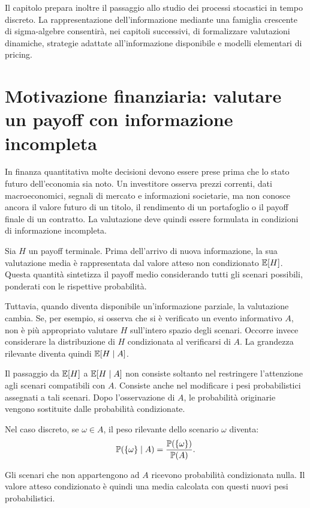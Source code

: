 Il capitolo prepara inoltre il passaggio allo studio dei processi stocastici in tempo discreto. La rappresentazione dell'informazione mediante una famiglia crescente di sigma-algebre consentir\`{a}, nei capitoli successivi, di formalizzare valutazioni dinamiche, strategie adattate all'informazione disponibile e modelli elementari di pricing.

\section{Motivazione finanziaria: valutare un payoff con informazione incompleta}

In finanza quantitativa molte decisioni devono essere prese prima che lo stato futuro dell'economia sia noto. Un investitore osserva prezzi correnti, dati macroeconomici, segnali di mercato e informazioni societarie, ma non conosce ancora il valore futuro di un titolo, il rendimento di un portafoglio o il payoff finale di un contratto. La valutazione deve quindi essere formulata in condizioni di informazione incompleta.

Sia $H$ un payoff terminale. Prima dell'arrivo di nuova informazione, la sua valutazione media \`{e} rappresentata dal valore atteso non condizionato $ \mathbb{E}[H] $. Questa quantit\`{a} sintetizza il payoff medio considerando tutti gli scenari possibili, ponderati con le rispettive probabilit\`{a}.

Tuttavia, quando diventa disponibile un'informazione parziale, la valutazione cambia. Se, per esempio, si osserva che si \`{e} verificato un evento informativo $A$, non \`{e} pi\`{u} appropriato valutare $H$ sull'intero spazio degli scenari. Occorre invece considerare la distribuzione di $H$ condizionata al verificarsi di $A$. La grandezza rilevante diventa quindi $ \mathbb{E}[H\mid A] $.

Il passaggio da $ \mathbb{E}[H] $ a $ \mathbb{E}[H\mid A] $ non consiste soltanto nel restringere l'attenzione agli scenari compatibili con $A$. Consiste anche nel modificare i pesi probabilistici assegnati a tali scenari. Dopo l'osservazione di $A$, le probabilit\`{a} originarie vengono sostituite dalle probabilit\`{a} condizionate.

Nel caso discreto, se $\omega\in A$, il peso rilevante dello scenario $\omega$ diventa:
\[
\mathbb{P}(\{\omega\}\mid A)
=
\frac{\mathbb{P}(\{\omega\})}{\mathbb{P}(A)}.
\]

Gli scenari che non appartengono ad $A$ ricevono probabilit\`{a} condizionata nulla. Il valore atteso condizionato \`{e} quindi una media calcolata con questi nuovi pesi probabilistici.

